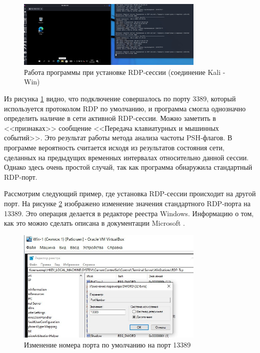 \documentclass[bachelor, och, coursework]{SCWorks}
\begin{document}
\begin{figure}[H]
  \centering
  \includegraphics[width=0.8\textwidth]{photo/rdp1.jpg}
  \caption{Работа программы при установке RDP-сессии (соединение Kali - Win) }
  \label{rdp1}
\end{figure}

Из рисунка \ref{rdp1} видно, что подключение совершалось по порту 3389, который используется протоколом RDP по умолчанию, и 
программа смогла однозначно определить наличие в сети активной RDP-сессии. Можно заметить в <<признаках>> сообщение <<Передача клавиатурных и
мышинных событий>>. Это результат работы метода анализа частоты PSH-флагов. В программе вероятность считается исходя из результатов состояния сети,
сделанных на предыдущих временных интервалах относительно данной сессии. Однако здесь очень простой случай, так как программа обнаружила стандартный
RDP-порт. 

Рассмотрим следующий пример, где установка RDP-сессии происходит на другой порт. На рисунке \ref{rdpport1} изображено изменение
значения стандартного RDP-порта на 13389. Это операция делается в редакторе реестра Windows. Информацию о том, как это можно сделать
описана в документации Microsoft \cite{rdpport}.


\begin{figure}[H]
  \centering
  \includegraphics[width=0.8\textwidth]{photo/rdpport1.jpg}
  \caption{Изменение номера порта по умолчанию на порт 13389}
  \label{rdpport1}
\end{figure}
\end{document}
